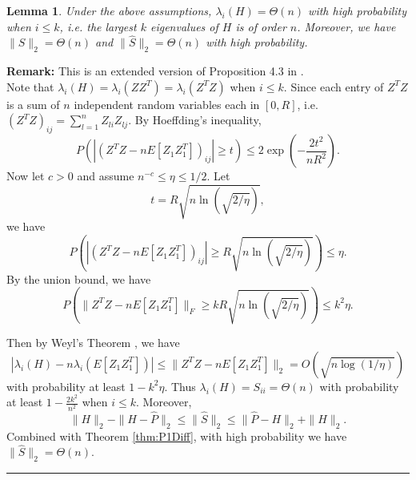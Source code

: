 \documentclass[a4paper]{article}
\newenvironment{proof}{{\bf Proof:  }}{\hfill\rule{2mm}{2mm}}
\newtheorem{lemma}[fact]{Lemma}
\renewcommand{\hat}{\widehat}
\begin{document}
\begin{lemma}
\label{lemma:eigSShatL1}
Under the above assumptions, $\lambda_i(H) = \Theta(n)$ with high probability when $i \le k$, i.e. the largest $k$ eigenvalues of $H$ is of order $n$. Moreover, we have $\| S \|_2 = \Theta(n)$ and $\| \hat{S} \|_2 = \Theta(n)$ with high probability.
\end{lemma}
\textbf{Remark:} This is an extended version of Proposition 4.3 in \citep{sussman2014consistent}. \\
\begin{proof}
Note that $\lambda_i(H) = \lambda_i(Z Z^T) = \lambda_i(Z^T Z)$ when $i \le k$. Since each entry of $Z^T Z$ is a sum of $n$ independent random variables each in $[0, R]$, i.e. $(Z^T Z)_{ij} = \sum_{l = 1}^n Z_{li} Z_{lj}$.
By Hoeffding's inequality,
\[
P(|(Z^T Z - n E[Z_1 Z_1^T])_{ij}| \ge t) \le 2 \exp(-\frac{2t^2}{n R^2}).
\]
Now let $c > 0$ and assume $n^{-c} \le \eta \le 1/2$. Let
\[
	t =  R \sqrt{n \ln(\sqrt{2/\eta})},
\]
we have
\[
P\left(|(Z^T Z - n E[Z_1 Z_1^T])_{ij}| \ge R \sqrt{n \ln(\sqrt{2/\eta})}\right) \le \eta.
\]
By the union bound, we have
\[
P\left(\|Z^T Z - n E[Z_1 Z_1^T]\|_F \ge k R \sqrt{n \ln(\sqrt{2/\eta})}\right) \le k^2 \eta.
\]

Then by Weyl's Theorem \citep{horn2012matrix}, we have
\[
|\lambda_i(H) - n \lambda_i(E[Z_1 Z_1^T])| \le \|Z^T Z - n E[Z_1 Z_1^T]\|_2 = O(\sqrt{n\log{(1/\eta)}})
\]
with probability at least $1 - k^2 \eta$.
Thus $\lambda_i(H) = S_{ii} = \Theta(n)$ with probability at least $1 - \frac{2 k^2}{n^2}$ when $i \le k$.
Moreover,
\[
\| H \|_2 - \|H - \hat{P}\|_2 \le \|\hat{S}\|_2 \le \|\hat{P} - H\|_2 + \|H\|_2.
\]
Combined with Theorem \ref{thm:P1Diff}, with high probability we have $\|\hat{S}\|_2 = \Theta(n)$.
\end{proof}
\end{document}
